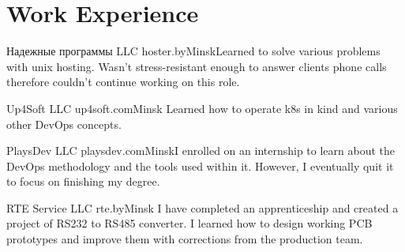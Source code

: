 \section{Work Experience}

{Надежные программы LLC hoster.by}{Minsk}{}{Learned to solve various
problems with unix hosting. Wasn't stress-resistant enough to answer
clients phone calls therefore couldn't continue working on this role.
}

{Up4Soft LLC up4soft.com}{Minsk}{}{
Learned how to operate k8s in kind and various other DevOps
concepts.
}

{PlaysDev LLC playsdev.com}{Minsk}{}{I enrolled on an internship to
learn about the DevOps methodology and the tools used within
it. However, I eventually quit it to focus on finishing my degree.}

{RTE Service LLC rte.by}{Minsk}{}{ I have completed an apprenticeship
  and created a project of RS232 to RS485 converter. I learned how to
  design working PCB prototypes and improve them with corrections from
  the production team.}


